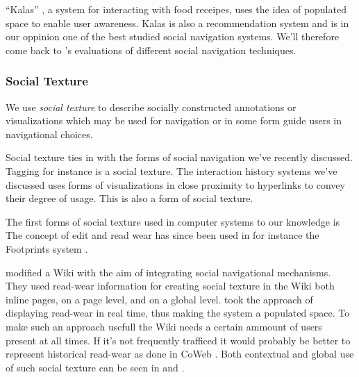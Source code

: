 ``Kalas'' \citep{svensson05}, a system for interacting with food receipes,
uses the idea of populated space to enable user awareness. Kalas is also a
recommendation system and is in our oppinion one of the best studied social
navigation systems. We'll therefore come back to \citeauthor{svensson05}'s
evaluations of different social navigation techniques.

\subsubsection{Social Texture}

We use \emph{social texture} to describe socially constructed annotations or
visualizations which may be used for navigation or in some form guide
users in navigational choices.

Social texture ties in with the forms of social navigation we've
recently discussed. Tagging for instance is a social texture.
The interaction history systems we've discussed uses forms of visualizations
in close proximity to hyperlinks to convey their degree of usage. This is also
a form of social texture.

The first forms of social texture used in computer systems to our knowledge is
The concept of edit and read wear has since been used in for instance the
Footprints system \citep{wexelblat99}.

\citet{xu06} modified a Wiki with the aim of integrating social navigational
mechanisms. They used read-wear information for creating social
texture in the Wiki both inline pages, on a page level, and on a global
level. \citeauthor{xu06} took the approach of displaying read-wear in real
time, thus making the system a populated space. To make such an approach
usefull the Wiki needs a certain ammount of users present at all times. If
it's not frequently trafficed it would probably be better to represent
historical read-wear as done in CoWeb \citep[p.~220]{dieberger00a}. Both
contextual and global use of such social texture can be seen in
 and .

